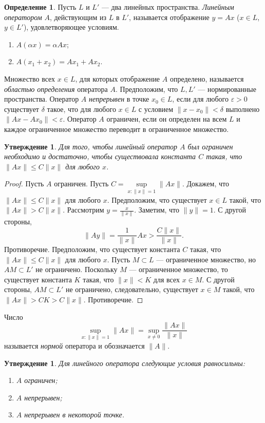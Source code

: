 \documentclass[12pt, titlepage, oneside]{amsbook}
\newtheorem{claim}[theorem]{Утверждение}
\theoremstyle{definition}
\newtheorem{definition}[theorem]{Определение}
\theoremstyle{remark}
\begin{document}
 \begin{definition}
Пусть $L$ и $L'$ --- два линейных пространства. \emph{Линейным оператором} $A$, действующим из $L$ в $L'$, называется отображение $y=Ax$ ($x\in L$, $y\in L'$), удовлетворяющее условиям.
\begin{enumerate}
\item $A(\alpha x)=\alpha Ax$;
\item $A(x_1+x_2)=Ax_1+Ax_2$.
\end{enumerate}
\end{definition}

Множество всех $x\in L$, для которых отображение $A$ определено, называется \emph{областью определения} оператора $A$. Предположим, что $L,L'$ --- нормированные пространства. Оператор $A$ \emph{непрерывен} в точке $x_0\in L$, если для любого $\varepsilon>0$ существует $\delta$ такое, что для любого $x\in L$ с условием $\|x-x_0\|<\delta$ выполнено $\|Ax-Ax_0\|<\varepsilon$. Оператор $A$ ограничен, если он определен на всем $L$ и каждое ограниченное множество переводит в ограниченное множество.


\begin{claim}
\label{Op1}
Для того, чтобы линейный оператор $A$ был ограничен необходимо и достаточно, чтобы существовала константа $C$ такая, что $\|Ax\|\leq C\|x\|$ для любого $x$.
\end{claim}

\begin{proof}
Пусть $A$ ограничен. Пусть $C=\sup\limits_{x:\|x\|= 1}\|Ax\|$. Докажем, что $\|Ax\|\leq C\|x\|$ для любого $x$. Предположим, что существует $x\in L$ такой, что $\|A x\|>C\|x\|$. Рассмотрим $y=\frac{x}{\|x\|}$. Заметим, что $\|y\|=1$. С другой стороны, $$\|Ay\|=\frac{1}{\|x\|}Ax>\frac{C\|x\|}{\|x\|}.$$ Противоречие. Предположим, что существует константа $C$ такая, что $\|Ax\|\leq C\|x\|$ для любого $x$. Пусть $M\subset L$ --- ограниченное множество, но $AM\subset L'$ не ограничено. Поскольку $M$ --- ограниченное множество, то существует константа $K$ такая, что $\|x\|<K$ для всех $x\in M$. С другой стороны, $AM\subset L'$ не ограничено, следовательно, существует $x\in M$ такой, что $\|Ax\|>CK>C\|x\|$. Противоречие.
\end{proof}

Число $$\sup\limits_{x:\|x\|= 1}\|Ax\|=\sup\limits_{x\neq 0}\frac{\|Ax\|}{\|x\|}$$ называется \emph{нормой} оператора и обозначается $\|A\|$.

\begin{claim}
\label{Op2} Для линейного оператора следующие условия равносильны:
\begin{enumerate}
\item $A$ ограничен;
\item $A$ непрерывен;
\item $A$ непрерывен в некоторой точке.
\end{enumerate}
\end{claim}
\end{document}
